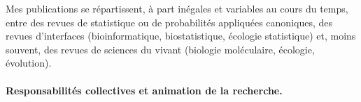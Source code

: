 
Mes publications se répartissent, à part inégales et variables au cours du temps, entre des revues de statistique ou de probabilités appliquées canoniques, des revues d’interfaces (bioinformatique, biostatistique, écologie statistique) et, moins souvent, des revues de sciences du vivant (biologie moléculaire, écologie, évolution).

\paragraph{Responsabilités collectives et animation de la recherche.}


